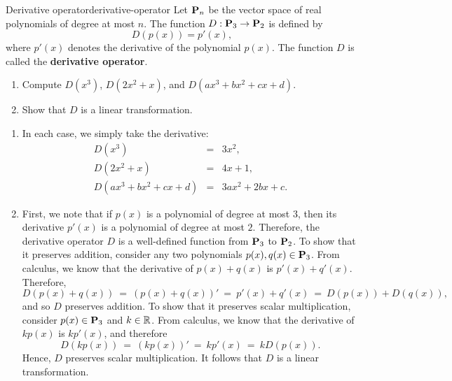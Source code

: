 \begin{example}{Derivative operator}{derivative-operator}
  Let $\mathbf{P}_n$ be the vector space of real polynomials of degree at
  most $n$. The function $D:\mathbf{P}_3\to\mathbf{P}_2$ is defined by
  \begin{equation*}
    D(p(x)) = p'(x),
  \end{equation*}
  where $p'(x)$ denotes the derivative of the polynomial $p(x)$. The
  function $D$ is called the \textbf{derivative operator}.
  \begin{enumialphparenastyle}
    \begin{enumerate}
    \item Compute $D(x^3)$, $D(2x^2+x)$, and $D(ax^3+bx^2+cx+d)$.
    \item Show that $D$ is a linear transformation.
    \end{enumerate}
  \end{enumialphparenastyle}
\end{example}

\begin{solution}
  \begin{enumialphparenastyle}
    \begin{enumerate}
    \item In each case, we simply take the derivative:
      \begin{eqnarray*}
        D(x^3) &=& 3x^2, \\
        D(2x^2+x) &=& 4x+1, \\
        D(ax^3+bx^2+cx+d) &=& 3ax^2 + 2bx + c.
      \end{eqnarray*}
    \item First, we note that if $p(x)$ is a polynomial of degree at
      most $3$, then its derivative $p'(x)$ is a polynomial of degree
      at most $2$. Therefore, the derivative operator $D$ is a
      well-defined function from $\mathbf{P}_3$ to $\mathbf{P}_2$. To show that
      it preserves addition, consider any two polynomials
      $p(x),q(x)\in\mathbf{P}_3$. From calculus, we know that the
      derivative of $p(x)+q(x)$ is $p'(x)+q'(x)$. Therefore,
      \begin{equation*}
        D(p(x)+q(x)) ~=~ (p(x)+q(x))' ~=~ p'(x)+q'(x) ~=~ D(p(x)) + D(q(x)),
      \end{equation*}
      and so $D$ preserves addition. To show that it preserves scalar
      multiplication, consider $p(x)\in\mathbf{P}_3$ and $k\in\mathbb{R}$. From
      calculus, we know that the derivative of $kp(x)$ is $kp'(x)$, and
      therefore
      \begin{equation*}
        D(kp(x)) ~=~ (kp(x))' ~=~ kp'(x) ~=~ kD(p(x)).
      \end{equation*}
      Hence, $D$ preserves scalar multiplication. It follows that $D$ is a
      linear transformation.
    \end{enumerate}
  \end{enumialphparenastyle}
\end{solution}

